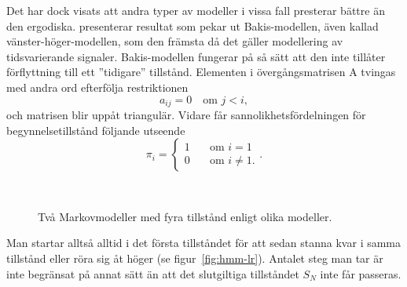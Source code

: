\documentclass[../rapport_MVEX01-11-05]{subfiles}
\begin{document}
Det har dock visats att andra typer av modeller i vissa fall presterar
bättre än den ergodiska. 
presenterar resultat som pekar ut Bakis-modellen, även kallad
vänster-höger-modellen, som den främsta då det gäller modellering
av tidsvarierande signaler. Bakis-modellen fungerar på så sätt att den
inte tillåter förflyttning till ett ''tidigare'' tillstånd. Elementen i
övergångsmatrisen A tvingas med andra ord efterfölja restriktionen
\begin{equation*}
a_{ij} = 0 \quad\text{om }j<i,
\end{equation*}
och matrisen blir uppåt triangulär.
Vidare får sannolikhetsfördelningen för begynnelsetillstånd följande
utseende
\begin{equation*}
\pi_i = \begin{cases}
         1 & \quad\text{om } i = 1\\
         0 & \quad\text{om } i \neq 1.\end{cases}.
\end{equation*}  

\begin{figure}[tb]
  \centering
	\\[2em]
  \caption{Två Markovmodeller med fyra tillstånd enligt olika modeller.}
  \label{fig:hmm-lr-lrb}
\end{figure}

Man startar alltså alltid i det första tillståndet för att sedan
stanna kvar i samma tillstånd eller röra sig åt höger (se
figur~\vref{fig:hmm-lr}). Antalet steg
man tar är inte begränsat på annat sätt än att det slutgiltiga
tillståndet $S_N$ inte får passeras.
\end{document}
